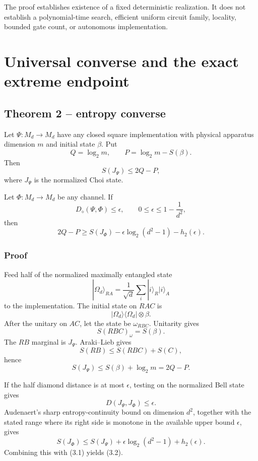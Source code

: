 \documentclass[11pt,a4paper]{article}
\numberwithin{equation}{section}
\begin{document}
The proof establishes existence of a fixed deterministic realization. It
does not establish a polynomial-time search, efficient uniform circuit
family, locality, bounded gate count, or autonomous implementation.

\section{Universal converse and the exact extreme
endpoint}\label{universal-converse-and-the-exact-extreme-endpoint}

\subsection*{Theorem 2 -- entropy
converse}\label{theorem-2-entropy-converse}

Let \(\Psi:M_d\to M_d\) have any closed square implementation with
physical apparatus dimension \(m\) and initial state \(\beta\). Put \[
Q=\log_2m,\qquad P=\log_2m-S(\beta).
\] Then \[
S(J_\Psi)\le2Q-P,
\tag{3.1}
\] where \(J_\Psi\) is the normalized Choi state.

Let \(\Phi:M_d\to M_d\) be any channel. If \[
D_\diamond(\Psi,\Phi)\le\epsilon,
\qquad
0\le\epsilon\le1-\frac1{d^2},
\] then \[
2Q-P
\ge
S(J_\Phi)
-\epsilon\log_2(d^2-1)
-h_2(\epsilon).
\tag{3.2}
\]

\subsubsection{Proof}\label{proof-1}

Feed half of the normalized maximally entangled state \[
|\Omega_d\rangle_{RA}
=
\frac1{\sqrt d}\sum_i|i\rangle_R|i\rangle_A
\] to the implementation. The initial state on \(RAC\) is \[
|\Omega_d\rangle\langle\Omega_d|\otimes\beta.
\] After the unitary on \(AC\), let the state be \(\omega_{RBC}\).
Unitarity gives \[
S(RBC)_\omega=S(\beta).
\] The \(RB\) marginal is \(J_\Psi\). Araki--Lieb gives \[
S(RB)\le S(RBC)+S(C),
\] hence \[
S(J_\Psi)
\le
S(\beta)+\log_2m
=
2Q-P.
\]

If the half diamond distance is at most \(\epsilon\), testing on the
normalized Bell state gives \[
D(J_\Psi,J_\Phi)\le\epsilon.
\] Audenaert's sharp entropy-continuity bound on dimension \(d^2\),
together with the stated range where its right side is monotone in the
available upper bound \(\epsilon\), gives \[
S(J_\Phi)
\le
S(J_\Psi)
+\epsilon\log_2(d^2-1)
+h_2(\epsilon).
\] Combining this with (3.1) yields (3.2).
\end{document}
